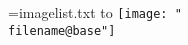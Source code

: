 \documentclass[a4paper]{article}
\newcounter{cnt}
\begin{document}
\makeatletter
\newread\reader
\openin\reader=imagelist.txt\relax
\begingroup
{}\relax
\loop
	\readline\reader to \data
    \unless\ifeof\reader
            \filename@parse{\data}  
            \texttt{[image: "\\filename@base"]} %
	 {	%
	\vspace{4pt}\par %
	\setcounter{cnt}{1}
	} {	%
	\hspace*{4pt}
	\addtocounter{cnt}{1}
	}
\repeat
\endgroup
\closein\reader
\makeatother
\end{document}
